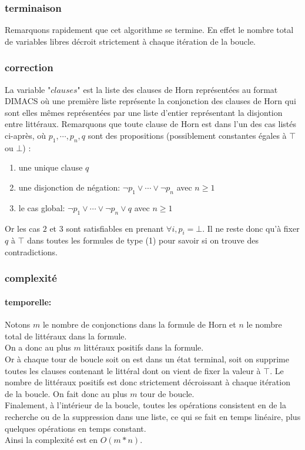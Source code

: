 \documentclass{article}
\begin{document}
\subsubsection{terminaison}
Remarquons rapidement que cet algorithme se termine. En effet le nombre total de variables libres décroit strictement à chaque itération de la boucle.

\subsubsection{correction}
La variable "$clauses$" est la liste des clauses de Horn représentées au format DIMACS où une première liste représente la conjonction des clauses de Horn qui sont elles mêmes représentées par une liste d'entier représentant la disjontion entre littéraux. Remarquons que toute clause de Horn est dans l'un des cas listés ci-après, où $p_1,\cdots,p_n,q$ sont des propositions (possiblement constantes égales à $\top$ ou $\bot$) :
\begin{enumerate}
    \item une unique clause $q$ 
    \item une disjonction de négation: $\neg p_1\vee\cdots\vee\neg p_n$ avec $n\geq1$
    \item le cas global: $\neg p_1\vee\cdots\vee\neg p_n\vee q$ avec $n\geq1$
\end{enumerate}
Or les cas $2$ et $3$ sont satisfiables en prenant $\forall i, p_i=\bot$. Il ne reste donc qu'à fixer $q$ à $\top$ dans toutes les formules de type (1) pour savoir si on trouve des contradictions.

\subsubsection{complexité}
\paragraph{temporelle:}
Notons $m$ le nombre de conjonctions dans la formule de Horn et $n$ le nombre total de littéraux dans la formule.\\
On a donc au plus $m$ littéraux positifs dans la formule.\\
Or à chaque tour de boucle soit on est dans un état terminal, soit on supprime toutes les clauses contenant le littéral dont on vient de fixer la valeur à $\top$. Le nombre de littéraux positifs est donc strictement décroissant à chaque itération de la boucle. On fait donc au plus $m$ tour de boucle. \\
Finalement, à l'intérieur de la boucle, toutes les opérations consistent en de la recherche ou de la suppression dans une liste, ce qui se fait en temps linéaire, plus quelques opérations en temps constant.  \\
Ainsi la complexité est en $O(m*n)$.
\end{document}
